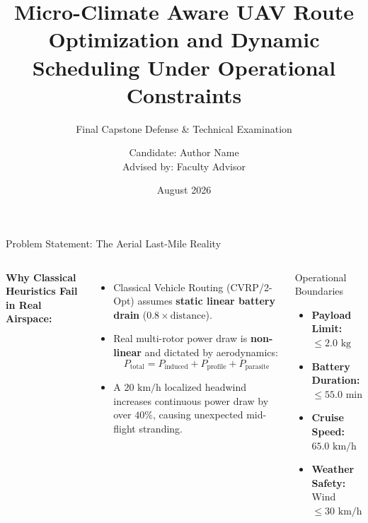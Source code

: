 \documentclass[aspectratio=169]{beamer}
\title[UAV Route Optimization via Deep Learning]{Micro-Climate Aware UAV Route Optimization and Dynamic Scheduling Under Operational Constraints}
\subtitle{Final Capstone Defense \& Technical Examination}
\author[Author Name]{Candidate: Author Name \\ \small Advised by: Faculty Advisor}
\institute[Institution]{Department of Computer Science \& Autonomous Robotics \\ Institution Name}
\date{August 2026}
\begin{document}
\begin{frame}
  \titlepage
\end{frame}

\begin{frame}{Problem Statement: The Aerial Last-Mile Reality}
  \begin{columns}
    \textbf{Why Classical Heuristics Fail in Real Airspace:}
    \begin{itemize}
      \item Classical Vehicle Routing (CVRP/2-Opt) assumes \textbf{static linear battery drain} ($0.8 \times \text{distance}$).
      \item Real multi-rotor power draw is \textbf{non-linear} and dictated by aerodynamics:
      $$P_{\text{total}} = P_{\text{induced}} + P_{\text{profile}} + P_{\text{parasite}}$$
      \item A $20\text{ km/h}$ localized headwind increases continuous power draw by over $40\%$, causing unexpected mid-flight stranding.
    \end{itemize}
    \begin{alertblock}{Operational Boundaries}
      \begin{itemize}
        \item \textbf{Payload Limit:} $\le 2.0\text{ kg}$
        \item \textbf{Battery Duration:} $\le 55.0\text{ min}$
        \item \textbf{Cruise Speed:} $65.0\text{ km/h}$
        \item \textbf{Weather Safety:} Wind $\le 30\text{ km/h}$
      \end{itemize}
    \end{alertblock}
  \end{columns}
\end{frame}
\end{document}
